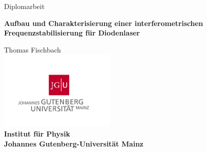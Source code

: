 

\thispagestyle{plain}
\begin{titlepage}
\begin{center}

\vspace*{0.5cm}

\Large{Diplomarbeit}\\

\vspace*{2.2cm}

\fontsize{25pt}{34pt}\selectfont
\bf{Aufbau und Charakterisierung einer interferometrischen Frequenzstabilisierung für Diodenlaser}

\vspace*{1.5cm}

\Large{Thomas Fischbach}\\[5ex]

\vspace*{4.2cm}
\includegraphics[width=0.42\textwidth]{gfx/JGU-Logo}\\
\bf{Institut für Physik}\\
Johannes Gutenberg-Universität Mainz\\
\vspace*{1cm}
\normalsize\mdseries{\today}\\

\end{center}
\end{titlepage}

\tableofcontents
\listoffigures
\listoftables


